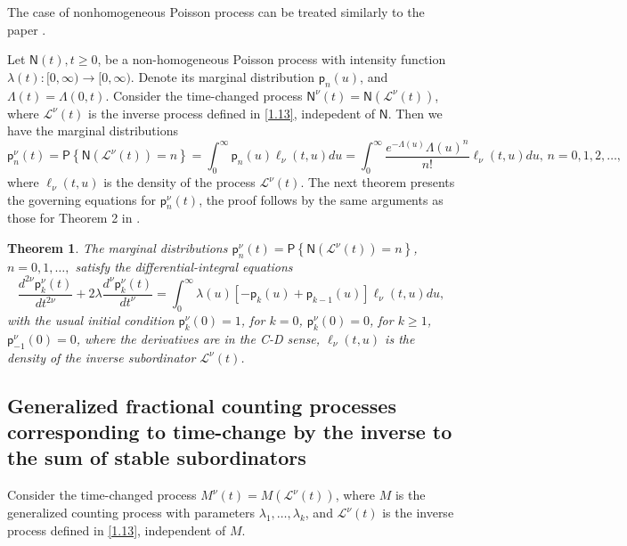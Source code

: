 \documentclass[12pt]{article}
\theoremstyle{definition}
\theoremstyle{plain}
\newtheorem{theorem}{Theorem}
\newcommand{\Prob}{\mathsf{P}}
\begin{document}
The case of nonhomogeneous Poisson process can be treated similarly  to the paper \cite{BS2019}. 

Let  $\mathsf{N}(t), t\geq0$, be a non-homogeneous Poisson process with intensity function $\lambda(t):[0,\infty)\to[0,\infty)$. Denote its marginal distribution $\mathsf p_n(u)$, and 
$\Lambda(t)=\Lambda(0,t)$. Consider the time-changed process $\mathsf{N}^\nu(t)=\mathsf{N}(\mathcal{L}^\nu(t))$, where $\mathcal{L}^\nu(t)$ is the inverse process defined in \eqref{1.13},  indepedent of $\mathsf{N}$. Then we have the marginal distributions
$$
   \mathsf p_n^\nu(t)=\Prob\left\{\mathsf{N}\left(\mathcal{L}^\nu(t)\right)=n\right\}
    =\int_{0}^{\infty}\mathsf p_n(u)\ell_\nu(t,u)du
    =\int_{0}^{\infty}\frac{e^{-\Lambda(u)}\Lambda(u)^n}{n!}\ell_\nu(t,u)du, \, n=0,1,2,\dots,
$$
where $\ell_\nu(t,u)$ is the density of the process $\mathcal{L}^\nu(t)$. The next theorem  presents the governing equations for  $\mathsf p_n^\nu(t)$, the proof   follows by the same arguments as those for Theorem 2 in \cite{BS2019}. 
\begin{theorem}
     The marginal distributions $\mathsf p_n^\nu(t)=\Prob\left\{\mathsf{N}\left(\mathcal{L}^\nu(t)\right)=n\right\}$, $n=0,1,\dots,$ satisfy the differential-integral equations
    \begin{equation}\label{fDp}
    \frac{d^{2\nu} \mathsf p_k^\nu(t)}{dt^{2\nu}} + 2\lambda \frac{d^\nu \mathsf p_k^\nu(t)}{dt^\nu}=\int_{0}^{\infty}\lambda(u)\left[-\mathsf p_k(u)+ \mathsf p_{k-1}(u)\right]\ell_\nu(t,u)du,
    \end{equation}
    with the usual initial condition
    $
    \mathsf p^\nu_k(0)=    
    1$, for $k=0$, $
    \mathsf p^\nu_k(0)=
    0$, for $k\geq1$,
    $\mathsf p_{-1}^\nu(0)=0$, where the derivatives are in the  C-D sense,  $\ell_\nu(t,u)$ is the density of the inverse subordinator $\mathcal{L}^\nu(t)$.
\end{theorem}



\subsection{Generalized fractional counting processes  corresponding to time-change by the inverse to the sum of stable subordinators}


Consider the time-changed process $M^\nu(t)=M(\mathcal{L}^\nu(t))$, where $M$ is the generalized counting process with parameters $\lambda_1, \ldots, \lambda_k$, and $\mathcal{L}^\nu(t)$ is the inverse process defined in \eqref{1.13},   independent of $M$.
\end{document}
